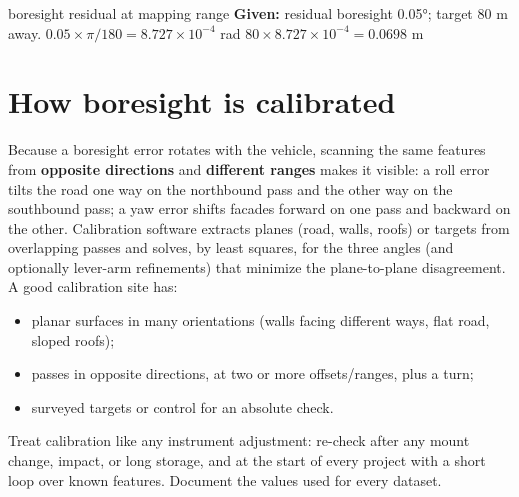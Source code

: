 \begin{worked}{boresight residual at mapping range}
\textbf{Given:} residual boresight 0.05°; target 80 m away.
 $0.05\times\pi/180=8.727\times10^{-4}$ rad
 $80\times8.727\times10^{-4}=0.0698$ m
\end{worked}

\section{How boresight is calibrated}

\begin{eng}
Because a boresight error rotates with the vehicle, scanning the same features from \textbf{opposite directions} and \textbf{different ranges} makes it visible: a roll error tilts the road one way on the northbound pass and the other way on the southbound pass; a yaw error shifts facades forward on one pass and backward on the other. Calibration software extracts planes (road, walls, roofs) or targets from overlapping passes and solves, by least squares, for the three angles (and optionally lever-arm refinements) that minimize the plane-to-plane disagreement. A good calibration site has:
\begin{itemize}
\item planar surfaces in many orientations (walls facing different ways, flat road, sloped roofs);
\item passes in opposite directions, at two or more offsets/ranges, plus a turn;
\item surveyed targets or control for an absolute check.
\end{itemize}
\end{eng}

\begin{tip}
Treat calibration like any instrument adjustment: re-check after any mount change, impact, or long storage, and at the start of every project with a short loop over known features. Document the values used for every dataset.
\end{tip}

